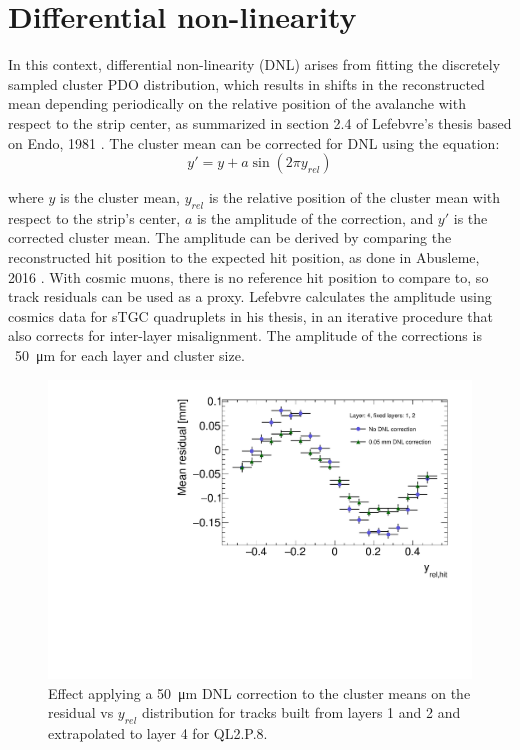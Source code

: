 \section{Differential non-linearity}
\label{appendix:systematics_dnl}

In this context, differential non-linearity (DNL) arises from fitting the discretely sampled cluster PDO distribution, which results in shifts in the reconstructed mean depending periodically on the relative position of the avalanche with respect to the strip center, as summarized in section 2.4 of Lefebvre's thesis \cite{lefebvre_thesis} based on Endo, 1981 \cite{endo_systematic_1981}. The cluster mean can be corrected for DNL using the equation:
\begin{equation}
\label{eqn:dnl_corr}
y' = y + a \sin \left( 2 \pi y_{rel} \right)
\end{equation}

where $y$ is the cluster mean, $y_{rel}$ is the relative position of the cluster mean with respect to the strip's center, $a$ is the amplitude of the correction, and $y'$ is the corrected cluster mean. The amplitude can be derived by comparing the reconstructed hit position to the expected hit position, as done in Abusleme, 2016 \cite{abusleme_performance_2016}. With cosmic muons, there is no reference hit position to compare to, so track residuals can be used as a proxy. Lefebvre calculates the amplitude using cosmics data for sTGC quadruplets in his thesis, \cite{lefebvre_thesis} in an iterative procedure that also corrects for inter-layer misalignment. The amplitude of the corrections is ~\SI{50}{\micro\meter} for each layer and cluster size. 

\begin{figure}
    \centering
    \includegraphics[width = \textwidth]{figures/figure_dnl_profiles_blue_QL2P08_3100V_2021-06-18_no_dnl_green_QL2P08_3100V_2021-06-18_2_50um_universal_DNL_layer4_fixed12.pdf}
    \caption{Effect applying a \SI{50}{\micro\meter} DNL correction to the cluster means on the residual vs $y_{rel}$ distribution for tracks built from layers 1 and 2 and extrapolated to layer 4 for QL2.P.8.}
    \label{fig:dnl_corr_effect}
\end{figure}

